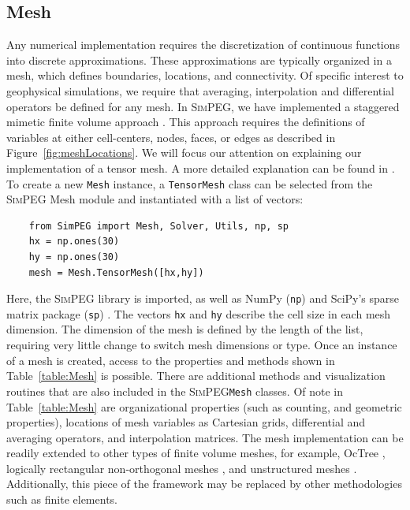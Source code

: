 \documentclass[preprint,review,3p,times,onecolumn,authoryear]{elsarticle}
\newcommand{\SimPEG}{\textsc{SimPEG}\xspace}
\newcommand{\Mesh}{\texttt{Mesh}\xspace}
\begin{document}
\subsection{Mesh}
\label{sub:mesh}

Any numerical implementation requires the discretization of continuous
functions into discrete approximations. These approximations are typically
organized in a mesh, which defines boundaries, locations, and
connectivity. Of specific interest to geophysical simulations, we require
that averaging, interpolation and differential operators be defined for
any mesh. In \SimPEG, we have implemented a staggered mimetic finite
volume approach \citep{Hyman1999,Hyman2002}. This approach requires the definitions of
variables at either cell-centers, nodes, faces, or edges as described in
Figure~\ref{fig:meshLocations}. We will focus our attention on explaining
our implementation of a tensor mesh. A more detailed explanation can be
found in \cite{haber2015computational}.
To create a new \Mesh instance, a \texttt{TensorMesh} class can be selected from the
\SimPEG Mesh module and instantiated with a list of vectors:

{%
{\scriptsize\begin{verbatim}
    from SimPEG import Mesh, Solver, Utils, np, sp
    hx = np.ones(30)
    hy = np.ones(30)
    mesh = Mesh.TensorMesh([hx,hy])
\end{verbatim}}
}
\noindent
Here, the \SimPEG library is imported, as well as NumPy (\texttt{np}) and SciPy's sparse
matrix package (\texttt{sp}) \citep{scipyOliphant,scipy}. The vectors \texttt{hx} and \texttt{hy} describe the cell size in each mesh dimension. The dimension of the mesh is defined by the length of the list, requiring very little change to switch mesh dimensions or type.
Once an instance of a mesh is created, access to the properties and methods shown in
Table~\ref{table:Mesh} is possible. There are additional methods and visualization routines that are also included in the \SimPEG \Mesh classes.
Of note in Table~\ref{table:Mesh} are
organizational properties (such as counting, and geometric properties),
locations of mesh variables as Cartesian grids,
differential and averaging operators,
and interpolation matrices.
The mesh implementation can be readily extended to
other types of finite volume meshes, for example, OcTree \citep{HaHe06}, logically
rectangular non-orthogonal meshes \citep{Hyman2002}, and unstructured meshes \citep{Ollivier-gooch2002}.
Additionally, this piece of the framework
may be replaced by other methodologies such as finite elements.
\end{document}
